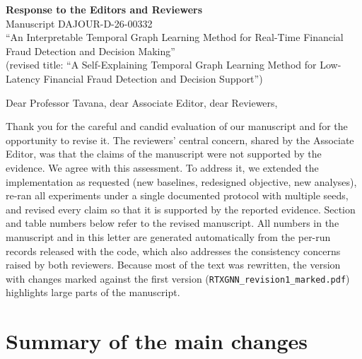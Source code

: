 \documentclass[11pt]{article}
\begin{document}
\begin{center}
{\Large\bfseries Response to the Editors and Reviewers}\\[4pt]
Manuscript DAJOUR-D-26-00332\\
``An Interpretable Temporal Graph Learning Method for Real-Time Financial Fraud Detection and Decision Making''\\
(revised title: ``A Self-Explaining Temporal Graph Learning Method for Low-Latency Financial Fraud Detection and Decision Support'')
\end{center}

\bigskip

Dear Professor Tavana, dear Associate Editor, dear Reviewers,

Thank you for the careful and candid evaluation of our manuscript and for the opportunity to revise it. The reviewers' central concern, shared by the Associate Editor, was that the claims of the manuscript were not supported by the evidence. We agree with this assessment. To address it, we extended the implementation as requested (new baselines, redesigned objective, new analyses), re-ran all experiments under a single documented protocol with multiple seeds, and revised every claim so that it is supported by the reported evidence. Section and table numbers below refer to the revised manuscript. All numbers in the manuscript and in this letter are generated automatically from the per-run records released with the code, which also addresses the consistency concerns raised by both reviewers. Because most of the text was rewritten, the version with changes marked against the first version (\texttt{RTXGNN\_revision1\_marked.pdf}) highlights large parts of the manuscript.

\section*{Summary of the main changes}
\end{document}
